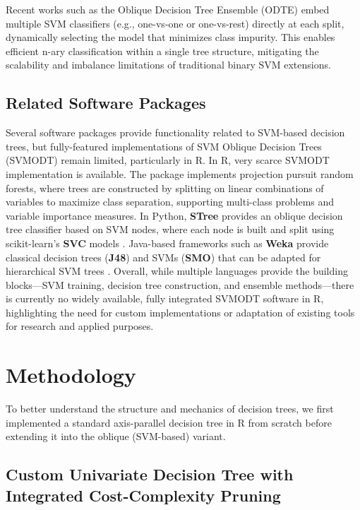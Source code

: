 Recent works such as the Oblique Decision Tree Ensemble (ODTE) \citep{montanana2025} embed multiple SVM classifiers (e.g., one-vs-one or one-vs-rest) directly at each split, dynamically selecting the model that minimizes class impurity. This enables efficient n-ary classification within a single tree structure, mitigating the scalability and imbalance limitations of traditional binary SVM extensions.

\subsection{Related Software Packages}\label{related-software-packages}

Several software packages provide functionality related to SVM-based decision trees, but fully-featured implementations of SVM Oblique Decision Trees (SVMODT) remain limited, particularly in R. In R, very scarce SVMODT implementation is available. The  package implements projection pursuit random forests, where trees are constructed by splitting on linear combinations of variables to maximize class separation, supporting multi-class problems and variable importance measures. In Python, \textbf{STree} \citep{Montanana2021} provides an oblique decision tree classifier based on SVM nodes, where each node is built and split using scikit-learn's \textbf{SVC} models \citep{scikit2011}. Java-based frameworks such as \textbf{Weka} provide classical decision trees (\textbf{J48}) and SVMs (\textbf{SMO}) that can be adapted for hierarchical SVM trees \citep{menkovski2008}. Overall, while multiple languages provide the building blocks---SVM training, decision tree construction, and ensemble methods---there is currently no widely available, fully integrated SVMODT software in R, highlighting the need for custom implementations or adaptation of existing tools for research and applied purposes.

\section{Methodology}\label{methodology}

To better understand the structure and mechanics of decision trees, we first implemented a standard axis-parallel decision tree in R from scratch before extending it into the oblique (SVM-based) variant.

\subsection{Custom Univariate Decision Tree with Integrated Cost-Complexity Pruning}\label{custom-univariate-decision-tree-with-integrated-cost-complexity-pruning}

